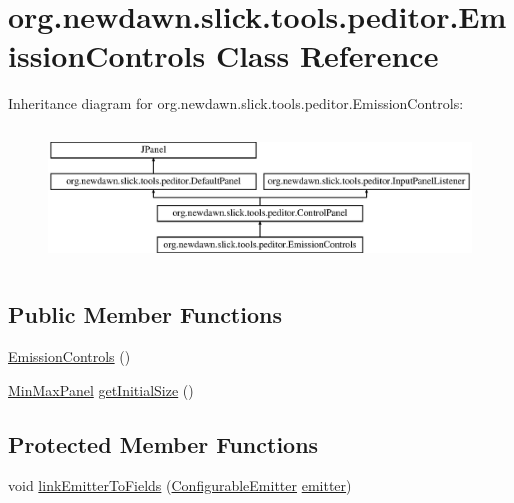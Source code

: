 \hypertarget{classorg_1_1newdawn_1_1slick_1_1tools_1_1peditor_1_1_emission_controls}{}\section{org.\+newdawn.\+slick.\+tools.\+peditor.\+Emission\+Controls Class Reference}
\label{classorg_1_1newdawn_1_1slick_1_1tools_1_1peditor_1_1_emission_controls}
Inheritance diagram for org.\+newdawn.\+slick.\+tools.\+peditor.\+Emission\+Controls\+:\begin{figure}[H]
\begin{center}
\leavevmode
\includegraphics[height=3.660131cm]{classorg_1_1newdawn_1_1slick_1_1tools_1_1peditor_1_1_emission_controls}
\end{center}
\end{figure}
\subsection*{Public Member Functions}
\begin{DoxyCompactItemize}
\item 
\mbox{\hyperlink{classorg_1_1newdawn_1_1slick_1_1tools_1_1peditor_1_1_emission_controls_ad66caf24e2baeffc2ed67aa237a499f3}{Emission\+Controls}} ()
\item 
\mbox{\hyperlink{classorg_1_1newdawn_1_1slick_1_1tools_1_1peditor_1_1_min_max_panel}{Min\+Max\+Panel}} \mbox{\hyperlink{classorg_1_1newdawn_1_1slick_1_1tools_1_1peditor_1_1_emission_controls_a81b51c70c6f34f446016899adfea4d63}{get\+Initial\+Size}} ()
\end{DoxyCompactItemize}
\subsection*{Protected Member Functions}
\begin{DoxyCompactItemize}
\item 
void \mbox{\hyperlink{classorg_1_1newdawn_1_1slick_1_1tools_1_1peditor_1_1_emission_controls_aa4e3a65cda3dd69a728c6abd96c6b0a1}{link\+Emitter\+To\+Fields}} (\mbox{\hyperlink{classorg_1_1newdawn_1_1slick_1_1particles_1_1_configurable_emitter}{Configurable\+Emitter}} \mbox{\hyperlink{classorg_1_1newdawn_1_1slick_1_1tools_1_1peditor_1_1_control_panel_aaa170169fa574cb6b271f782afcd2517}{emitter}})
\end{DoxyCompactItemize}
